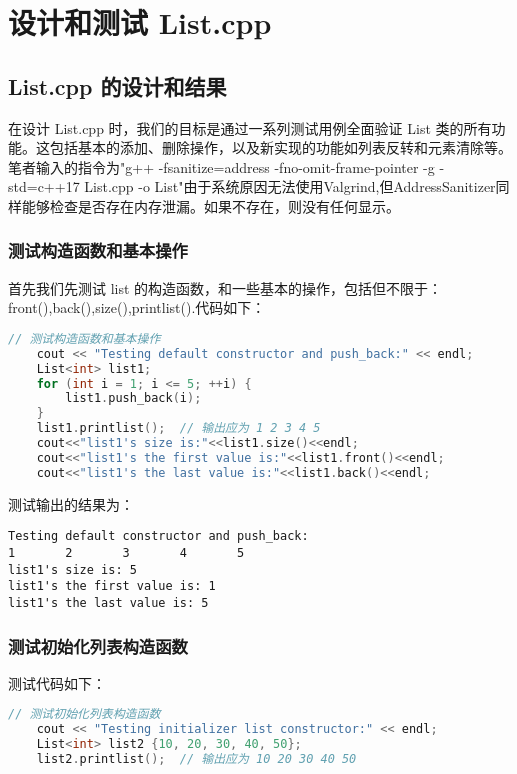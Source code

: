 \documentclass[fontset=fandol]{ctexart}
\begin{document}
\section{设计和测试 List.cpp}  
\subsection{List.cpp 的设计和结果}  
在设计 List.cpp 时，我们的目标是通过一系列测试用例全面验证 List 类的所有功能。这包括基本的添加、删除操作，以及新实现的功能如列表反转和元素清除等。笔者输入的指令为"g++ -fsanitize=address -fno-omit-frame-pointer -g -std=c++17 List.cpp -o List"由于系统原因无法使用Valgrind,但AddressSanitizer同样能够检查是否存在内存泄漏。如果不存在，则没有任何显示。

\subsubsection{测试构造函数和基本操作}
首先我们先测试 list 的构造函数，和一些基本的操作，包括但不限于：front(),back(),size(),printlist().代码如下：
\begin{lstlisting}[language=C++, caption={测试构造函数和基本操作}]  
// 测试构造函数和基本操作  
    cout << "Testing default constructor and push_back:" << endl;  
    List<int> list1;  
    for (int i = 1; i <= 5; ++i) {  
        list1.push_back(i);  
    }  
    list1.printlist();  // 输出应为 1 2 3 4 5  
    cout<<"list1's size is:"<<list1.size()<<endl;
    cout<<"list1's the first value is:"<<list1.front()<<endl;
    cout<<"list1's the last value is:"<<list1.back()<<endl;

\end{lstlisting}

测试输出的结果为：
\begin{verbatim}  
Testing default constructor and push_back:  
1       2       3       4       5  
list1's size is: 5  
list1's the first value is: 1  
list1's the last value is: 5  
\end{verbatim}  

\subsubsection{测试初始化列表构造函数}
测试代码如下：
\begin{lstlisting}[language=C++, caption={测试初始化列表构造函数}]  
// 测试初始化列表构造函数  
    cout << "Testing initializer list constructor:" << endl;  
    List<int> list2 {10, 20, 30, 40, 50};  
    list2.printlist();  // 输出应为 10 20 30 40 50
\end{lstlisting}
\end{document}
